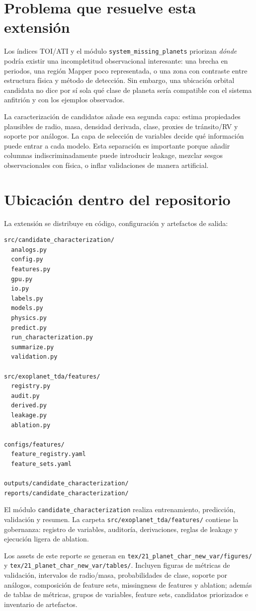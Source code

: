 \documentclass[11pt]{article}
\begin{document}
\section{Problema que resuelve esta extensión}

Los índices TOI/ATI y el módulo \texttt{system\_missing\_planets} priorizan \emph{dónde} podría existir una incompletitud observacional interesante: una brecha en periodos, una región Mapper poco representada, o una zona con contraste entre estructura física y método de detección. Sin embargo, una ubicación orbital candidata no dice por sí sola qué clase de planeta sería compatible con el sistema anfitrión y con los ejemplos observados.

La caracterización de candidatos añade esa segunda capa: estima propiedades plausibles de radio, masa, densidad derivada, clase, proxies de tránsito/RV y soporte por análogos. La capa de selección de variables decide qué información puede entrar a cada modelo. Esta separación es importante porque añadir columnas indiscriminadamente puede introducir leakage, mezclar sesgos observacionales con física, o inflar validaciones de manera artificial.

\section{Ubicación dentro del repositorio}

La extensión se distribuye en código, configuración y artefactos de salida:

\begin{verbatim}
src/candidate_characterization/
  analogs.py
  config.py
  features.py
  gpu.py
  io.py
  labels.py
  models.py
  physics.py
  predict.py
  run_characterization.py
  summarize.py
  validation.py

src/exoplanet_tda/features/
  registry.py
  audit.py
  derived.py
  leakage.py
  ablation.py

configs/features/
  feature_registry.yaml
  feature_sets.yaml

outputs/candidate_characterization/
reports/candidate_characterization/
\end{verbatim}

El módulo \texttt{candidate\_characterization} realiza entrenamiento, predicción, validación y resumen. La carpeta \texttt{src/exoplanet\_tda/features/} contiene la gobernanza: registro de variables, auditoría, derivaciones, reglas de leakage y ejecución ligera de ablation.

Los assets de este reporte se generan en \texttt{tex/21\_planet\_char\_new\_var/figures/} y \texttt{tex/21\_planet\_char\_new\_var/tables/}. Incluyen figuras de métricas de validación, intervalos de radio/masa, probabilidades de clase, soporte por análogos, composición de feature sets, missingness de features y ablation; además de tablas de métricas, grupos de variables, feature sets, candidatos priorizados e inventario de artefactos.
\end{document}
